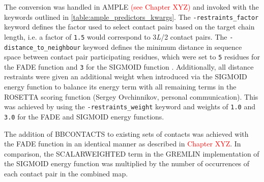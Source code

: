 The conversion was handled in AMPLE \textcolor{red}{(see Chapter XYZ)} and invoked with the keywords outlined in \cref{table:ample_predictors_kwargs}. The \texttt{-restraints\_factor} keyword defines the factor used to select contact pairs based on the target chain length, i.e. a factor of \texttt{1.5} would correspond to 3\textit{L}/2 contact pairs. The \texttt{-distance\_to\_neighbour} keyword defines the minimum distance in sequence space between contact pair participating residues, which were set to \texttt{5} residues for the FADE function \cite{Michel2014-ci} and \texttt{3} for the SIGMOID function \cite{Ovchinnikov2015-nt}. Additionally, all distance restraints were given an additional weight when introduced via the SIGMOID energy function to balance its energy term with all remaining terms in the ROSETTA scoring function (Sergey Ovchinnikov, personal communication). This was achieved by using the \texttt{-restraints\_weight} keyword and weights of \texttt{1.0} and \texttt{3.0} for the FADE and SIGMOID energy functions.

The addition of BBCONTACTS to existing sets of contacts was achieved with the FADE function in an identical manner as described in \textcolor{red}{Chapter XYZ}. In comparison, the SCALARWEIGHTED term in the GREMLIN implementation of the SIGMOID energy function \cite{Ovchinnikov2015-nt} was multiplied by the number of occurrences of each contact pair in the combined map.

